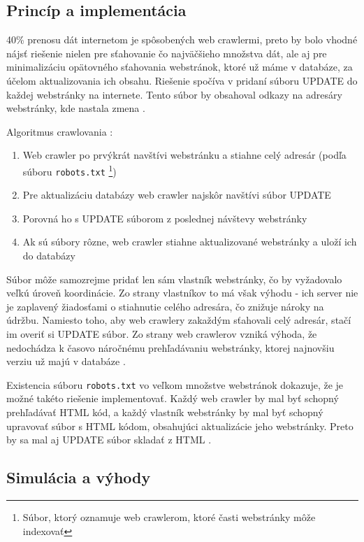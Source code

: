 \documentclass[10pt,twoside,slovak,a4paper]{article}
\begin{document}
\subsection{Princíp a implementácia}

40\% prenosu dát internetom je spôsobených web crawlermi, preto by bolo vhodné nájsť riešenie nielen pre sťahovanie čo najväčšieho množstva dát, ale aj pre minimalizáciu opätovného sťahovania webstránok, ktoré už máme v databáze, za účelom aktualizovania ich obsahu. Riešenie spočíva v pridaní súboru UPDATE do každej webstránky na internete. Tento súbor by obsahoval odkazy na adresáry webstránky, kde nastala zmena \cite{mishra2010smart}.

Algoritmus crawlovania \cite{mishra2010smart}:

\begin{enumerate}
    \item Web crawler po prvýkrát navštívi webstránku a stiahne celý adresár (podľa súboru \texttt{robots.txt} \footnote{Súbor, ktorý oznamuje web crawlerom, ktoré časti webstránky môže indexovať})
    \item Pre aktualizáciu databázy web crawler najskôr navštívi súbor UPDATE
    \item Porovná ho s UPDATE súborom z poslednej návštevy webstránky
    \item Ak sú súbory rôzne, web crawler stiahne aktualizované webstránky a uloží ich do databázy
\end{enumerate}

Súbor môže samozrejme pridať len sám vlastník webstránky, čo by vyžadovalo veľkú úroveň koordinácie. Zo strany vlastníkov to má však výhodu - ich server nie je zaplavený žiadosťami o stiahnutie celého adresára, čo znižuje nároky na údržbu. Namiesto toho, aby web crawlery zakaždým sťahovali celý adresár, stačí im overiť si UPDATE súbor. Zo strany web crawlerov vzniká výhoda, že nedochádza k časovo náročnému prehľadávaniu webstránky, ktorej najnovšiu verziu už majú v databáze \cite{mishra2010smart}.

Existencia súboru \texttt{robots.txt} vo veľkom množstve webstránok dokazuje, že je možné takéto riešenie implementovať. Každý web crawler by mal byť schopný prehľadávať HTML kód, a každý vlastník webstránky by mal byť schopný upravovať súbor s HTML kódom, obsahujúci aktualizácie jeho webstránky. Preto by sa mal aj UPDATE súbor skladať z HTML \cite{mishra2010smart}. 

\subsection{Simulácia a výhody}
\end{document}
